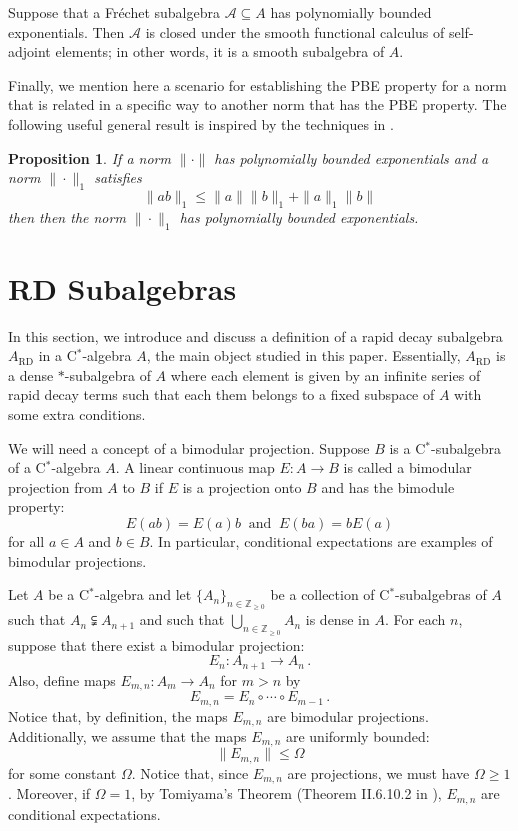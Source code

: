 \documentclass[12pt,reqno]{amsart}
\numberwithin{equation}{section}
\newcommand{\Z}{{\mathbb Z}}
\newtheorem{prop}[theo]{{\sc \bf Proposition}}
\begin{document}
Suppose that a Fr\'echet subalgebra $\mathcal{A}\subseteq A$ has polynomially bounded exponentials. Then $\mathcal{A}$ is closed under the smooth functional calculus of self-adjoint elements; in other words, it is a smooth subalgebra of $A$. 

Finally, we mention here a scenario for establishing the PBE property for a norm that is related in a specific way to another norm that has the PBE property. The following useful general result is inspired by the techniques in \cite{BC}.
\begin{prop}\label{blackcunt} If a norm $\|\cdot\|$ has polynomially bounded exponentials and a norm $\|\cdot\|_1$ satisfies
\begin{equation*}
\|ab\|_1\leq\|a\|\|b\|_1+\|a\|_1\|b\|
\end{equation*}
then then the norm $\|\cdot\|_1$ has polynomially bounded exponentials.
\end{prop}


\section{RD Subalgebras}

In this section, we introduce and discuss a definition of a rapid decay subalgebra $A_\textrm{RD}$ in a C$^*$-algebra $A$, the main object studied in this paper.  Essentially, $A_\textrm{RD}$ is a dense $*$-subalgebra of $A$ where each element is given by an infinite series of rapid decay terms such that each them belongs to a fixed subspace of $A$ with some extra conditions.

We will need a concept of a bimodular projection. Suppose $B$ is a C$^*$-subalgebra of a C$^*$-algebra $A$. A linear continuous map $E:A\to B$ is called a bimodular projection from $A$ to $B$ if $E$ is a projection onto $B$ and has the bimodule property:
\begin{equation*}
E(ab)=E(a)b\ \text{ and }\ E(ba)=bE(a)
\end{equation*}
for all $a\in A$ and $b\in B$. In particular, conditional expectations are examples of bimodular projections.

Let $A$ be a C$^*$-algebra and let $\{A_n\}_{n\in\Z_{\ge0}}$ be a collection of C$^*$-subalgebras of $A$ such that $A_n\subsetneqq A_{n+1}$ and such that $\bigcup_{n\in\Z_{\ge0}}A_n$ is dense in $A$.  For each $n$, suppose that there exist a bimodular projection:
\begin{equation*}
E_n:A_{n+1}\to A_n\,.
\end{equation*}
Also, define maps $E_{m,n}:A_m\to A_n$ for $m>n$ by
\begin{equation*}
E_{m,n} = E_n\circ\cdots\circ E_{m-1}\,.
\end{equation*}
Notice that, by definition, the maps $E_{m,n}$ are bimodular projections.
Additionally, we assume that the maps $E_{m,n}$ are uniformly bounded:
\begin{equation}\label{Emnunifbnd}
\|E_{m,n}\|\leq \Omega
\end{equation}
for some constant $\Omega$. Notice that, since $E_{m,n}$ are projections, we must have $\Omega\ge1$.  Moreover, if $\Omega=1$, by Tomiyama's Theorem (Theorem II.6.10.2 in \cite{Black}), $E_{m,n}$ are conditional expectations.
\end{document}
